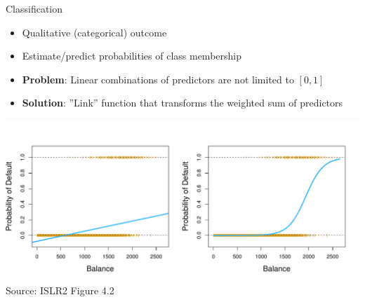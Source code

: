 \documentclass[ignorenonframetext,xcolor=x11names]{beamer}
\begin{document}

\begin{frame}{Classification}
  \begin{itemize}
     \item Qualitative (categorical) outcome
     \item Estimate/predict probabilities of class membership
     \item \textbf{Problem}: Linear combinations of predictors are not limited to $[0, 1]$
     \item \textbf{Solution}: ''Link'' function that transforms the weighted sum of predictors
  \end{itemize}
\includegraphics[width=\textwidth]{../class11/Figures_Chapters_1-6/Chapter4/4_2.pdf}
\scriptsize Source: ISLR2 Figure 4.2
\end{frame}
\end{document}

